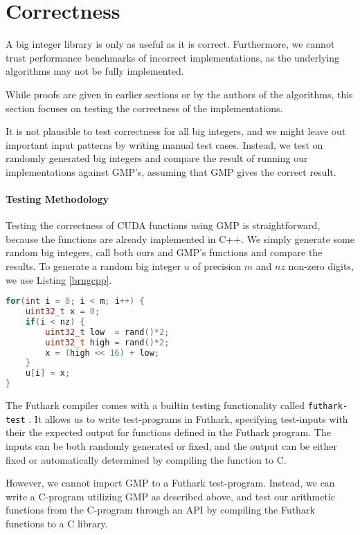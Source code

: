 \section{Correctness}
\label{sec:cor}

A big integer library is only as useful as it is correct. Furthermore, we cannot
trust performance benchmarks of incorrect implementations, as the underlying
algorithms may not be fully implemented.

While proofs are given in earlier sections or by the authors of the algorithms,
this section focuses on testing the correctness of the implementations.

It is not plausible to test correctness for all big integers, and we might leave
out important input patterns by writing manual test cases. Instead, we test on
randomly generated big integers and compare the result of running our
implementations against GMP's, assuming that GMP gives the correct result.

\paragraph{Testing Methodology}

Testing the correctness of CUDA functions using GMP is straightforward, because
the functions are already implemented in C++. We simply generate some random big
integers, call both ours and GMP's functions and compare the results. To
generate a random big integer $u$ of precision $m$ and $\mathit{nz}$ non-zero
digits, we use Listing \ref{brngcpp}.

\begin{lstlisting}[language=CPP, caption={\footnotesize Random big integer generator in C++.}, label={brngcpp}]
for(int i = 0; i < m; i++) {
    uint32_t x = 0;
    if(i < nz) {
        uint32_t low  = rand()*2;
        uint32_t high = rand()*2;
        x = (high << 16) + low;
    }
    u[i] = x;
}
\end{lstlisting}

The Futhark compiler comes with a builtin testing functionality called
\texttt{futhark-test} \cite{futguide}. It allows us to write test-programs in
Futhark, specifying test-inputs with their the expected output for functions
defined in the Futhark program. The inputs can be both randomly generated or
fixed, and the output can be either fixed or automatically determined by
compiling the function to C.

However, we cannot import GMP to a Futhark test-program. Instead, we can write a
C-program utilizing GMP as described above, and test our arithmetic functions
from the C-program through an API by compiling the Futhark functions to a C
library.

